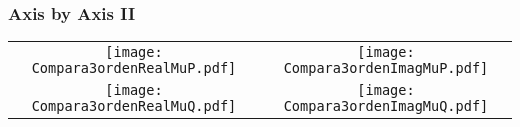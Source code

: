 \documentclass{beamer}
\begin{document}
\begin{frame}
  \frametitle{Axis by Axis II}
  \begin{tabular}{cc}
    \texttt{[image: Compara3ordenRealMuP.pdf]} &   
    \texttt{[image: Compara3ordenImagMuP.pdf]} \\
    \texttt{[image: Compara3ordenRealMuQ.pdf]} &
    \texttt{[image: Compara3ordenImagMuQ.pdf]}
 \end{tabular}    
 
\end{frame}
\end{document}
